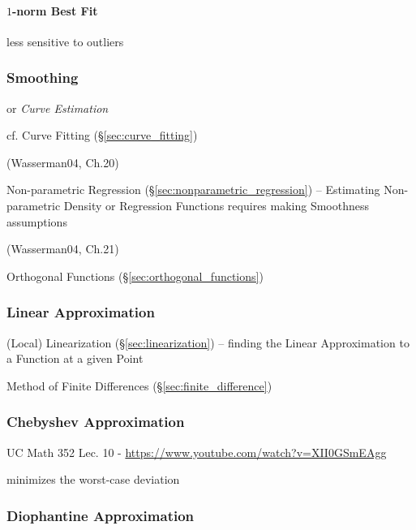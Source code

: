 \paragraph{$1$-norm Best Fit}\label{sec:1norm_best_fit}\hfill

less sensitive to outliers



\subsubsection{Smoothing}\label{sec:smoothing}

or \emph{Curve Estimation}

cf. Curve Fitting (\S\ref{sec:curve_fitting})

(Wasserman04, Ch.20)

Non-parametric Regression (\S\ref{sec:nonparametric_regression}) -- Estimating
Non-parametric Density or Regression Functions requires making Smoothness
assumptions

(Wasserman04, Ch.21)

Orthogonal Functions (\S\ref{sec:orthogonal_functions})



\subsubsection{Linear Approximation}\label{sec:linear_approximation}

\fist (Local) Linearization (\S\ref{sec:linearization}) -- finding the Linear
Approximation to a Function at a given Point

\fist Method of Finite Differences (\S\ref{sec:finite_difference})



\subsubsection{Chebyshev Approximation}\label{sec:chebyshev_approximation}

UC Math 352 Lec. 10 - \url{https://www.youtube.com/watch?v=XII0GSmEAgg}

minimizes the worst-case deviation



\subsubsection{Diophantine Approximation}\label{sec:diophantine_approximation}

